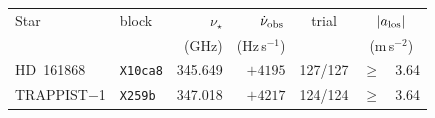 \begin{tabular}{@{}llr@{~}r@{~}c@{~}r@{~}l@{}}
\hline
Star & block & $\nu_\star$ & $\dot\nu_{\rm obs}$ & trial & \multicolumn{2}{c}{$|a_{\rm los}|$} \\
 & & (GHz) & (Hz\,s$^{-1}$) & & \multicolumn{2}{c}{(m\,s$^{-2}$)} \\
\hline
HD~161868 & \texttt{X10ca8} & 345.649 & $+4195$ & 127/127 & $\ge$ & 3.64 \\
TRAPPIST$-$1 & \texttt{X259b} & 347.018 & $+4217$ & 124/124 & $\ge$ & 3.64 \\
\hline
\end{tabular}
